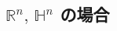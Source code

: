 \documentclass[geometry_main]{subfiles}
\begin{document}





\subsection{$\mathbb{R}^n,\, \mathbb{H}^n$ の場合}
\end{document}
